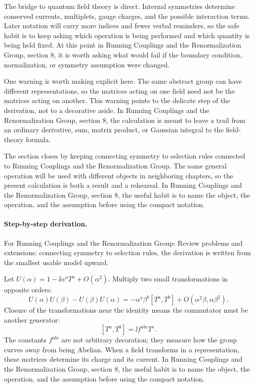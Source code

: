 The bridge to quantum field theory is direct.  Internal symmetries determine conserved currents, multiplets, gauge charges, and the possible interaction terms.  Later notation will carry more indices and fewer verbal reminders, so the safe habit is to keep asking which operation is being performed and which quantity is being held fixed.  At this point in Running Couplings and the Renormalization Group, section 8, it is worth asking what would fail if the boundary condition, normalization, or symmetry assumption were changed.

One warning is worth making explicit here.  The same abstract group can have different representations, so the matrices acting on one field need not be the matrices acting on another.  This warning points to the delicate step of the derivation, not to a decorative aside.  In Running Couplings and the Renormalization Group, section 8, the calculation is meant to leave a trail from an ordinary derivative, sum, matrix product, or Gaussian integral to the field-theory formula.

The section closes by keeping connecting symmetry to selection rules connected to Running Couplings and the Renormalization Group.  The same general operation will be used with different objects in neighboring chapters, so the present calculation is both a result and a rehearsal.  In Running Couplings and the Renormalization Group, section 8, the useful habit is to name the object, the operation, and the assumption before using the compact notation.



\paragraph{Step-by-step derivation.}

For Running Couplings and the Renormalization Group: Review problems and extensions: connecting symmetry to selection rules, the derivation is written from the smallest usable model upward.

Let \(U(\alpha)=1-\ii\alpha^aT^a+O(\alpha^2)\).  Multiply two small transformations in opposite orders:
\[
  U(\alpha)U(\beta)-U(\beta)U(\alpha)
  =
  -\alpha^a\beta^b[T^a,T^b]+O(\alpha^2\beta,\alpha\beta^2).
\]
Closure of the transformations near the identity means the commutator must be another generator:
\[
  [T^a,T^b]=\ii f^{abc}T^c.
\]
The constants \(f^{abc}\) are not arbitrary decoration; they measure how the group curves away from being Abelian.  When a field transforms in a representation, these matrices determine its charge and its current.  In Running Couplings and the Renormalization Group, section 8, the useful habit is to name the object, the operation, and the assumption before using the compact notation.

